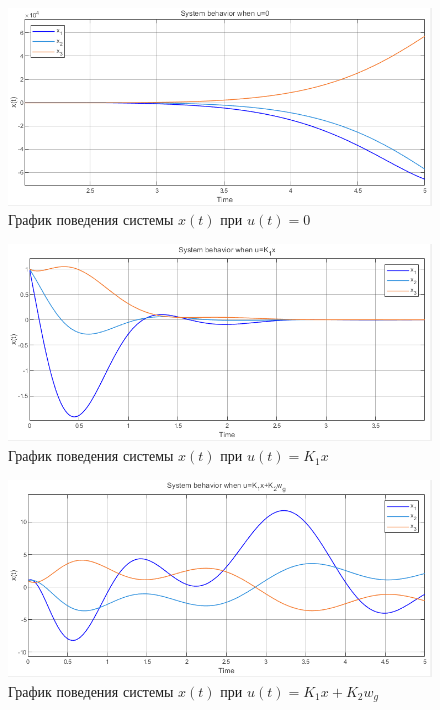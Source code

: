 \documentclass[a4paper, 12pt]{article}
\begin{document}
    \begin{figure}[H]
        \centering
        \includegraphics[scale=0.75]{2task_unull_x.png}
        \captionsetup{skip=0pt}
        \caption{График поведения системы $x(t)$ при $u(t)=0$}
        \label{fig:2task_unull_x}
    \end{figure}
    \begin{figure}[H]
        \centering
        \includegraphics[scale=0.75]{2task_uk_x.png}
        \captionsetup{skip=0pt}
        \caption{График поведения системы $x(t)$ при $u(t)=K_1x$}
        \label{fig:2task_uk_x}
    \end{figure}
    \begin{figure}[H]
        \centering
        \includegraphics[scale=0.75]{2task_ukk_x.png}
        \captionsetup{skip=0pt}
        \caption{График поведения системы $x(t)$ при $u(t)=K_1x+K_2 w_g$}
        \label{fig:2task_ukk_x}
    \end{figure}
\end{document}
